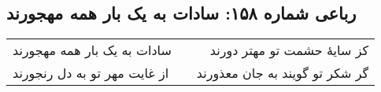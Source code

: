 \begin{center}
\section*{رباعی شماره ۱۵۸: سادات به یک بار همه مهجورند}
\label{sec:sh158}
\begin{longtable}{l p{0.5cm} r}
سادات به یک بار همه مهجورند
&&
کز سایهٔ حشمت تو مهتر دورند
\\
از غایت مهر تو به دل رنجورند
&&
گر شکر تو گویند به جان معذورند
\\
\end{longtable}
\end{center}
